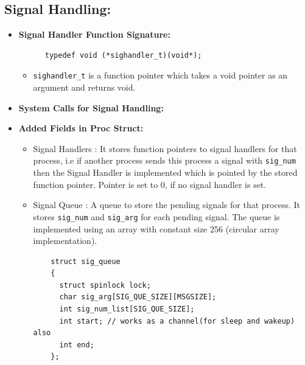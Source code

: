 \documentclass[a4 paper]{article}
\newcommand{\code}[1]{\texttt{#1}}
\begin{document}
\subsection*{Signal Handling:}
\begin{itemize}

\item \textbf{Signal Handler Function Signature:}

\begin{lstlisting}
      typedef void (*sighandler_t)(void*);
\end{lstlisting}

\vspace*{-1.5mm}

\begin{itemize}
\item \texttt{sighandler\_t} is a function pointer which takes a void pointer as an argument and returns void.
\end{itemize}

\item \textbf{System Calls for Signal Handling:}

\raggedbottom

\item \textbf{Added Fields in Proc Struct:}

\begin{itemize}
  \item Signal Handlers : It stores function pointers to signal handlers for that process, i.e if another process sends this process a signal with \code{sig\_num} then the Signal Handler is implemented which is pointed by the stored function pointer. Pointer is set to 0, if no signal handler is set.
  \item Signal Queue : A queue to store the pending signals for that process. It stores \code{sig\_num} and \code{sig\_arg} for each pending signal. The queue is implemented using an array with constant size 256 (circular array implementation).

  \begin{lstlisting}
    struct sig_queue
    {
      struct spinlock lock;
      char sig_arg[SIG_QUE_SIZE][MSGSIZE];
      int sig_num_list[SIG_QUE_SIZE];
      int start; // works as a channel(for sleep and wakeup) also
      int end;
    };
  \end{lstlisting}
\end{itemize}


\end{itemize}
\end{document}
